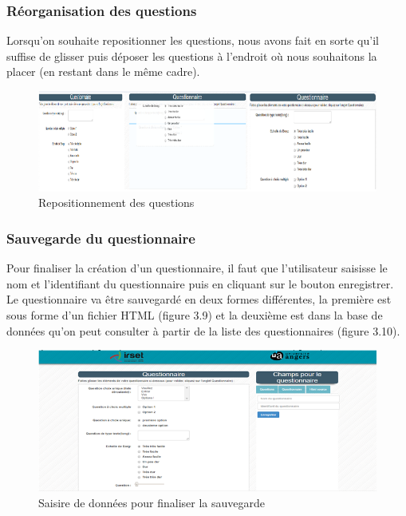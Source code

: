 \subsubsection{Réorganisation des questions}

Lorsqu'on souhaite repositionner les questions, nous avons fait en sorte qu'il suffise de glisser puis déposer les questions à l'endroit où nous souhaitons la placer (en restant dans le même cadre).



\begin{figure}[H]
    \begin{center}
	\includegraphics[scale=0.8]{img/questionnaire/repositionnement}
    \end{center}
    \caption{Repositionnement des questions}
\end{figure}

\subsubsection{Sauvegarde du questionnaire}

Pour finaliser la création d’un questionnaire, il faut que l’utilisateur saisisse le nom et l’identifiant du questionnaire puis en cliquant sur le bouton enregistrer. Le questionnaire va être sauvegardé en deux formes différentes, la première est sous forme d’un fichier HTML (figure 3.9) et la deuxième est dans la base de données qu’on peut consulter à partir de la liste des questionnaires (figure 3.10).


\begin{figure}[H]
    \begin{center}
	\includegraphics[scale=0.7]{img/questionnaire/enregistrement}
    \end{center}
    \caption{Saisire de données pour finaliser la sauvegarde}
\end{figure}


